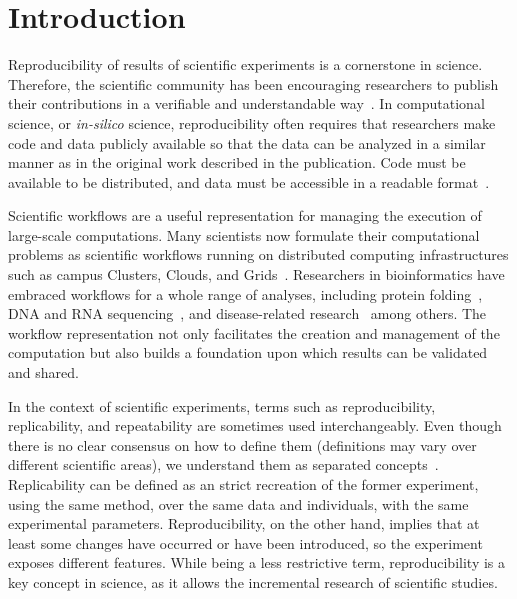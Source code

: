 \section{Introduction}

Reproducibility of results of scientific experiments is a cornerstone in 
science. Therefore, the scientific community has been encouraging researchers 
to publish their contributions in a verifiable and understandable 
way~\cite{YaleRoundtable09, James-XSEDE-2014}. In computational science, 
or \emph{in-silico} science, reproducibility often requires that researchers make 
code and data publicly available so that the data can be analyzed in a similar 
manner as in the original work described in the publication. Code must be available 
to be distributed, and data must be accessible in a readable format~\cite{bookReproducibility}. 

Scientific workflows are a useful representation for managing the execution of large-scale 
computations. Many scientists now formulate their computational problems as scientific 
workflows running on distributed computing infrastructures such as campus Clusters, 
Clouds, and Grids~\cite{workflowBook}. Researchers in bioinformatics have 
embraced workflows for a whole range of analyses, including protein folding~\cite{craddock2006science}, 
DNA and RNA sequencing~\cite{blankenberg2010galaxy, giardine2005galaxy, kepler-clotho}, 
and disease-related research~\cite{fisher2009systematic, gaizauskas2004} among others.
The workflow representation not only facilitates the creation and management of the 
computation but also builds a foundation upon which results can be validated and 
shared. 


In the context of scientific experiments, terms such as reproducibility, replicability, and 
repeatability are sometimes used interchangeably. Even though there is no clear 
consensus on how to define them (definitions may vary over different scientific areas), 
we understand them as separated concepts~\cite{Drummond2011}. Replicability 
can be defined as an strict recreation of the former experiment, using the same method,
over the same data and individuals, with the same experimental parameters. Reproducibility,
on the other hand, implies that at least some changes have occurred or have been introduced,
so the experiment exposes different features.  While being a less restrictive term, reproducibility
is a key concept in science, as it allows the incremental research of scientific studies.

